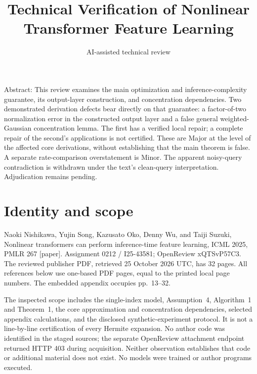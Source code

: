 \documentclass[10pt]{article}
\title{Technical Verification of Nonlinear Transformer Feature Learning}
\author{AI-assisted technical review}
\date{}
\begin{document}
\maketitle
Abstract: This review examines the main optimization and inference-complexity guarantee, its output-layer construction, and concentration dependencies. Two demonstrated derivation defects bear directly on that guarantee: a factor-of-two normalization error in the constructed output layer and a false general weighted-Gaussian concentration lemma. The first has a verified local repair; a complete repair of the second’s applications is not certified. These are Major at the level of the affected core derivations, without establishing that the main theorem is false. A separate rate-comparison overstatement is Minor. The apparent noisy-query contradiction is withdrawn under the text’s clean-query interpretation. Adjudication remains pending.\par
\section*{Identity and scope}
Naoki Nishikawa, Yujin Song, Kazusato Oko, Denny Wu, and Taiji Suzuki, Nonlinear transformers can perform inference-time feature learning, ICML 2025, PMLR 267 [paper]. Assignment 0212 / I25-43581; OpenReview xQTSvP57C3. The reviewed publisher PDF, retrieved 25 October 2026 UTC, has 32 pages. All references below use one-based PDF pages, equal to the printed local page numbers. The embedded appendix occupies pp. 13–32.\par
The inspected scope includes the single-index model, Assumption 4, Algorithm 1 and Theorem 1, the core approximation and concentration dependencies, selected appendix calculations, and the disclosed synthetic-experiment protocol. It is not a line-by-line certification of every Hermite expansion. No author code was identified in the staged sources; the separate OpenReview attachment endpoint returned HTTP 403 during acquisition. Neither observation establishes that code or additional material does not exist. No models were trained or author programs executed.\par
\end{document}

